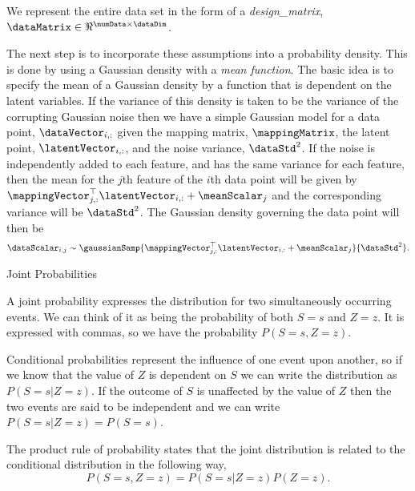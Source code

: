 We represent the entire data set in the form of a \emph{\gls{design_matrix}}, $\dataMatrix \in
\Re^{\numData\times\dataDim}$. 


The next step is to incorporate these assumptions into a probability
density. This is done by using a Gaussian density with a \emph{mean
  function}. The basic idea is to specify the mean of a Gaussian
density by a function that is dependent on the latent variables. If
the variance of this density is taken to be the variance of the
corrupting Gaussian noise then we have a simple Gaussian model for a
data point, $\dataVector_{i,:}$ given the mapping matrix,
$\mappingMatrix$, the latent point, $\latentVector_{i, :}$, and the
noise variance, $\dataStd^2$. If the noise is independently added to
each feature, and has the same variance for each feature, then the
mean for the $j$th feature of the $i$th data point will be given by
$\mappingVector_{j, :}^\top \latentVector_{i, :} + \meanScalar_j$ and
the corresponding variance will be $\dataStd^2$. The Gaussian density
governing the data point will then be
\[
\dataScalar_{i,j} \sim \gaussianSamp{\mappingVector_{j,
    :}^\top\latentVector_{i,:}+\meanScalar_j}{\dataStd^2}. \label{eqn:marginalDatum}
\]
% 
\begin{boxfloat}
  \caption{Joint Probabilities}\label{box:joint}

  \boxfontsize
  A joint probability expresses the distribution for two simultaneously
  occurring events. We can think of it as being the probability of both
  $S=s$ and $Z=z$. It is expressed with commas, so we have the
  probability $P(S=s, Z=z)$. 

  Conditional probabilities represent the influence of one event upon
  another, so if we know that the value of $Z$ is dependent on $S$ we
  can write the distribution as $P(S=s|Z=z)$. If the outcome of $S$ is
  unaffected by the value of $Z$ then the two events are said to be
  independent and we can write $P(S=s|Z=z)=P(S=s)$.

  The product rule of probability states that the joint distribution is
  related to the conditional distribution in the following way,
  \[
  P(S=s,Z=z)=P(S=s|Z=z)P(Z=z).
  \]
\end{boxfloat}

